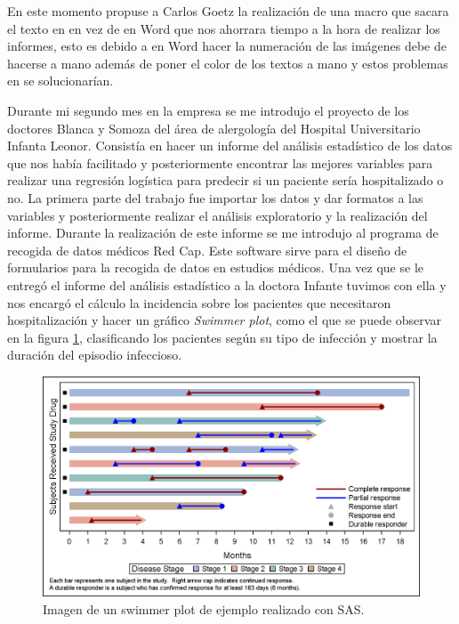 \documentclass[pdftex,11pt,a4paper]{book}
\begin{document}
En este momento propuse a Carlos Goetz la realización de una macro que sacara el texto en \latex en vez de en Word que nos ahorrara tiempo a la hora de realizar los informes, esto es debido a en Word hacer la numeración de las imágenes debe de hacerse a mano además de poner el color de los textos a mano y estos problemas en \latex se solucionarían.  


Durante mi segundo mes en la empresa se me introdujo el proyecto de los doctores Blanca y Somoza del área de alergología del Hospital Universitario Infanta Leonor. Consistía en hacer un informe del análisis estadístico de los datos que nos había facilitado y posteriormente encontrar las mejores variables para realizar una regresión logística para predecir si un paciente sería hospitalizado o no. La primera parte del trabajo fue importar los datos y dar formatos a las variables y posteriormente realizar el análisis exploratorio y la realización del informe. Durante la realización de este informe se me introdujo al programa de recogida de datos médicos Red Cap. Este software sirve para el diseño de formularios para la recogida de datos en estudios médicos.
Una vez que se le entregó el informe del análisis estadístico a la doctora Infante tuvimos con ella y nos encargó  el cálculo la incidencia sobre los pacientes que necesitaron hospitalización y hacer un gráfico \textit{Swimmer plot}, como el que se puede observar en la figura \ref{fig:swimmerplot}, clasificando los pacientes según su tipo de infección y mostrar la duración del episodio infeccioso. 
\begin{figure}
\begin{center}
\includegraphics[scale=0.35]{swimmer_plot.png}
\caption{Imagen de un swimmer plot de ejemplo realizado con SAS.}
\label{fig:swimmerplot}
\end{center}
\end{figure}
\end{document}
